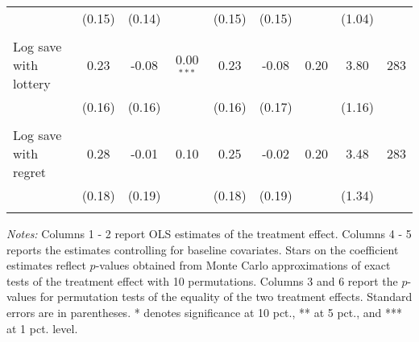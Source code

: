 \begin{table}[htbp]
{\begin{threeparttable}
\begin{tabular}{l*{8}{c}}
          &   (0.15)&   (0.14)&         &   (0.15)&   (0.15)&         &   (1.04)&         \\
          &         &         &         &         &         &         &         &         \\
Log save with lottery&     0.23&    -0.08&0.00$^{***}$&     0.23&    -0.08&     0.20&     3.80&      283\\
          &   (0.16)&   (0.16)&         &   (0.16)&   (0.17)&         &   (1.16)&         \\
          &         &         &         &         &         &         &         &         \\
Log save with regret&     0.28&    -0.01&     0.10&     0.25&    -0.02&     0.20&     3.48&      283\\
          &   (0.18)&   (0.19)&         &   (0.18)&   (0.19)&         &   (1.34)&         \\
          &         &         &         &         &         &         &         &         \\
\bottomrule \end{tabular} \begin{tablenotes}[flushleft] \footnotesize \item \emph{Notes:} Columns 1 - 2 report OLS estimates of the treatment effect. Columns 4 - 5 reports the estimates controlling for baseline covariates. Stars on the coefficient estimates reflect \(p\)-values obtained from Monte Carlo approximations of exact tests of the treatment effect with 10 permutations. Columns 3 and 6 report the \(p\)-values for permutation tests of the equality of the two treatment effects. Standard errors are in parentheses. * denotes significance at 10 pct., ** at 5 pct., and *** at 1 pct. level. \end{tablenotes} \end{threeparttable} } \end{table}

